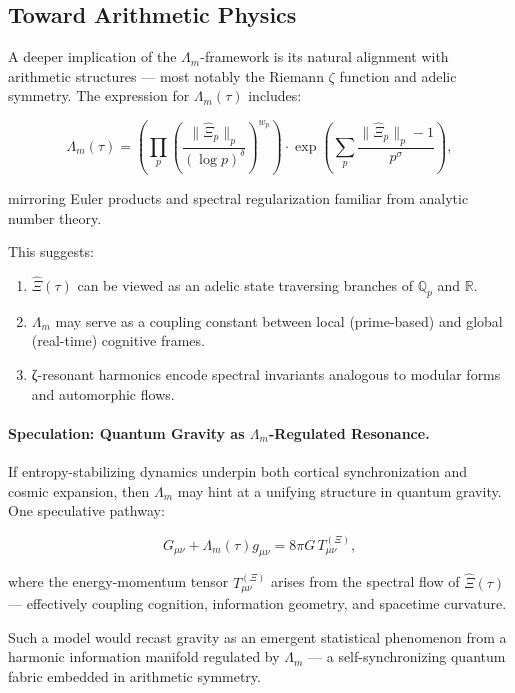 \documentclass[12pt]{article}
\theoremstyle{plain}
\begin{document}
\subsection{Toward Arithmetic Physics}

A deeper implication of the $\Lambda_m$-framework is its natural alignment with arithmetic structures — most notably the Riemann $\zeta$ function and adelic symmetry. The expression for $\Lambda_m(\tau)$ includes:

\begin{equation}
\Lambda_m(\tau) = \left( \prod_p \left( \frac{\|\hat{\Xi}_p\|_p}{(\log p)^\delta} \right)^{w_p} \right) \cdot \exp \left( \sum_p \frac{\|\hat{\Xi}_p\|_p - 1}{p^\sigma} \right),
\end{equation}

mirroring Euler products and spectral regularization familiar from analytic number theory.

This suggests:

\begin{enumerate}
    \item $\hat{\Xi}(\tau)$ can be viewed as an adelic state traversing branches of $\mathbb{Q}_p$ and $\mathbb{R}$.
    \item $\Lambda_m$ may serve as a coupling constant between local (prime-based) and global (real-time) cognitive frames.
    \item ζ-resonant harmonics encode spectral invariants analogous to modular forms and automorphic flows.
\end{enumerate}

\paragraph{Speculation: Quantum Gravity as $\Lambda_m$-Regulated Resonance.}

If entropy-stabilizing dynamics underpin both cortical synchronization and cosmic expansion, then $\Lambda_m$ may hint at a unifying structure in quantum gravity. One speculative pathway:

\begin{equation}
G_{\mu\nu} + \Lambda_m(\tau) g_{\mu\nu} = 8\pi G \, T_{\mu\nu}^{(\Xi)},
\end{equation}

where the energy-momentum tensor $T_{\mu\nu}^{(\Xi)}$ arises from the spectral flow of $\hat{\Xi}(\tau)$ — effectively coupling cognition, information geometry, and spacetime curvature.

Such a model would recast gravity as an emergent statistical phenomenon from a harmonic information manifold regulated by $\Lambda_m$ — a self-synchronizing quantum fabric embedded in arithmetic symmetry.
\end{document}
